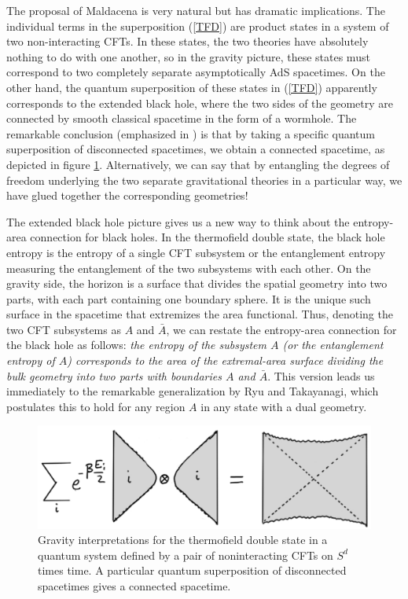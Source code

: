 \documentclass[12pt,epsf]{article}
\begin{document}
The proposal of Maldacena is very natural but has dramatic implications. The individual terms in the superposition (\ref{TFD}) are product states in a system of two non-interacting CFTs. In these states, the two theories have absolutely nothing to do with one another, so in the gravity picture, these states must correspond to two completely separate asymptotically AdS spacetimes. On the other hand, the quantum superposition of these states in (\ref{TFD}) apparently corresponds to the extended black hole, where the two sides of the geometry are connected by smooth classical spacetime in the form of a wormhole. The remarkable conclusion (emphasized in \cite{VanRaamsdonk:2009ar,VanRaamsdonk:2010pw}) is that by taking a specific quantum superposition of disconnected spacetimes, we obtain a connected spacetime, as depicted in figure \ref{qsup}. Alternatively, we can say that by entangling the degrees of freedom underlying the two separate gravitational theories in a particular way, we have glued together the corresponding geometries!

The extended black hole picture gives us a new way to think about the entropy-area connection for black holes. In the thermofield double state, the black hole entropy is the entropy of a single CFT subsystem or the entanglement entropy measuring the entanglement of the two subsystems with each other. On the gravity side, the horizon is a surface that divides the spatial geometry into two parts, with each part containing one boundary sphere. It is the unique such surface in the spacetime that extremizes the area functional. Thus, denoting the two CFT subsystems as $A$ and $\bar{A}$, we can restate the entropy-area connection for the black hole as follows: {\it the entropy of the subsystem $A$ (or the entanglement entropy of $A$) corresponds to the area of the extremal-area surface dividing the bulk geometry into two parts with boundaries $A$ and $\bar{A}$}. This version leads us immediately to the remarkable generalization by Ryu and Takayanagi, which postulates this to hold for any region $A$ in any state with a dual geometry.

\begin{figure}
\centering
\includegraphics[width = 0.7 \textwidth]{qsup.eps}
\caption{Gravity interpretations for the thermofield double state in a quantum system defined by a pair of noninteracting CFTs on $S^d$ times time. A particular quantum superposition of disconnected spacetimes gives a connected spacetime.}
\label{qsup}
\end{figure}
\end{document}
